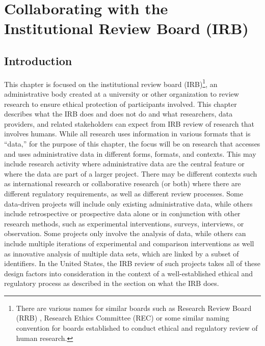 \hypertarget{irb}{%
\chapter{Collaborating with the Institutional Review Board (IRB)}\label{irb}}

\hrulefill

\hypertarget{introduction-1}{%
\section{Introduction}\label{introduction-1}}

This chapter is focused on the institutional review board (IRB)\footnote{There are various names for similar boards such as Research Review Board (RRB) \citet{chicagopublicschools2020}, Research Ethics Committee (REC) \citet{nhshealthresearchauthority2020} or some similar naming convention for boards established to conduct ethical and regulatory review of human research.}, an administrative body created at a university or other organization to review research to ensure ethical protection of participants involved. This chapter describes what the IRB does and does not do and what researchers, data providers, and related stakeholders can expect from IRB review of research that involves humans. While all research uses information in various formats that is ``data,'' for the purpose of this chapter, the focus will be on research that accesses and uses administrative data in different forms, formats, and contexts. This may include research activity where administrative data are the central feature or where the data are part of a larger project. There may be different contexts such as international research or collaborative research (or both) where there are different regulatory requirements, as well as different review processes. Some data-driven projects will include only existing administrative data, while others include retrospective or prospective data alone or in conjunction with other research methods, such as experimental interventions, surveys, interviews, or observation. Some projects only involve the analysis of data, while others can include multiple iterations of experimental and comparison interventions as well as innovative analysis of multiple data sets, which are linked by a subset of identifiers. In the United States, the IRB review of such projects takes all of these design factors into consideration in the context of a well-established ethical and regulatory process as described in the section on what the IRB does.

